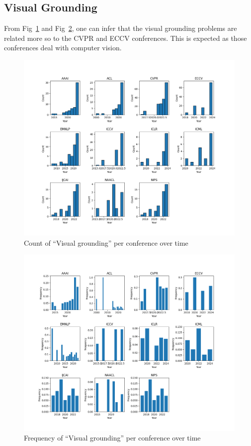 \documentclass[11pt]{article}
\begin{document}
\subsection{Visual Grounding}
From Fig~\ref{fig:appendix_visual_all_confs_count} and Fig~\ref{fig:appendix_visual_all_confs_freq}, one can infer that the visual grounding problems are related more so to the CVPR and ECCV conferences. This is expected as those conferences deal with computer vision.

\label{sec:appendix_word_sense_years_visual_grounding}
\begin{figure}[H]
  \includegraphics[width=0.75\columnwidth]{figs/grounding_figs/Visual/split_by_conf_grounding_dist.png}
  \centering
  \caption{Count of ``Visual grounding'' per conference over time}
  \label{fig:appendix_visual_all_confs_count}
\end{figure}

\begin{figure}[H]
  \includegraphics[width=0.75\columnwidth]{figs/freq_grounding_figs/Visual/split_by_conf_grounding_dist.png}
  \centering
  \caption{Frequency of ``Visual grounding'' per conference over time}
  \label{fig:appendix_visual_all_confs_freq}
\end{figure}
\end{document}
